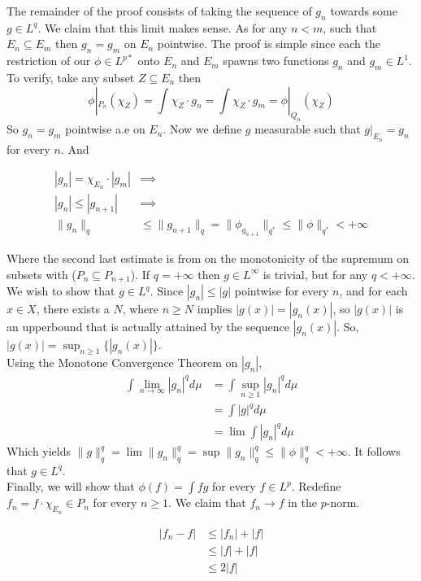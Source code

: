 \documentclass[../../main.tex]{subfiles}
\begin{document}
The remainder of the proof consists of taking the sequence of $g_n$ towards some $g\in L^q$. We claim that this limit makes sense. As for any $n<m$, such that $E_n\subseteq E_m$ then $g_n = g_m$ on $E_n$ pointwise. The proof is simple since each the restriction of our $\phi\in L^{p*}$ onto $E_n$ and $E_m$ spawns two functions $g_n$ and $g_m\in L^1$. To verify, take any subset $Z\subseteq E_n$ then $$
\phi|_{P_n}(\chi_Z) = \int \chi_Z\cdot g_n = \int \chi_Z\cdot g_m = \phi|_{Q_n}(\chi_Z)
$$
So $g_n = g_m$ pointwise a.e on $E_n$. Now we define $g$ measurable such that $g|_{E_n} = g_n$ for every $n$. And

\begin{align*}
    |g_n| = \chi_{E_n}\cdot |g_m|&\implies \\
    |g_n| \leq |g_{n+1}|&\implies \\
    \lVert g_n \rVert_q
    &\leq\lVert g_{n+1} \rVert_q = \lVert \phi_{g_{n+1}} \rVert_{q^*}
    \leq \lVert \phi \rVert_{q^*}
    < +\infty
\end{align*}



Where the second last estimate is from on the monotonicity of the supremum on subsets with ($P_n\subseteq P_{n+1}$). If $q = +\infty$ then $g\in L^\infty$ is trivial, but for any $q<+\infty$. We wish to show that $g\in L^q$. Since $|g_n|\leq |g|$ pointwise for every $n$, and for each $x\in X$, there exists a $N$, where $n\geq N$ implies $|g(x)| = |g_n(x)|$, so $|g(x)|$ is an upperbound that is actually attained by the sequence $|g_n(x)|$. So, $|g(x)| = \sup_{n\geq 1}\{|g_n(x)|\}$. \\

Using the Monotone Convergence Theorem on $|g_n|$, 
\begin{align*}
    \int \lim_{n\to\infty} |g_n|^q d\mu &= \int\sup_{n\geq 1}|g_n|^q d\mu\\
    &= \int |g|^qd\mu\\
    &= \lim \int |g_n|^q d\mu
\end{align*}
Which yields $\lVert g \rVert^q_q = \lim \lVert g_n \rVert^q_q = \sup \lVert g_n \rVert^q_q \leq \lVert \phi \rVert^q_q < +\infty$. It follows that $g\in L^q$.\\

Finally, we will show that $\phi(f) = \int fg$ for every $f\in L^p$. Redefine $f_n = f\cdot\chi_{E_n} \in P_n$ for every $n\geq 1$. We claim that $f_n \to f$ in the $p$-norm.


\begin{align*}
    |f_n - f| &\leq |f_n| + |f|\\
    &\leq |f| + |f|\\
    &\leq 2|f|
\end{align*}
\end{document}
